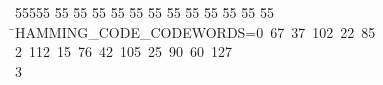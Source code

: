%
%
\begin{tabbing}
55555 \= 55 \= 55 \= 55 \= 55 \= 55 \= 55 \= 55 \= 55 \= 55 \= 55 \= 55 \= 55 \= \>HAMMING\_CODE\_CODEWORDS=0\ 67\ 37\ 102\ 22\ 85\ \\[0pt]
2\ 112\ 15\ 76\ 42\ 105\ 25\ 90\ 60\ 127\\[0pt]
3\>\end{tabbing}
